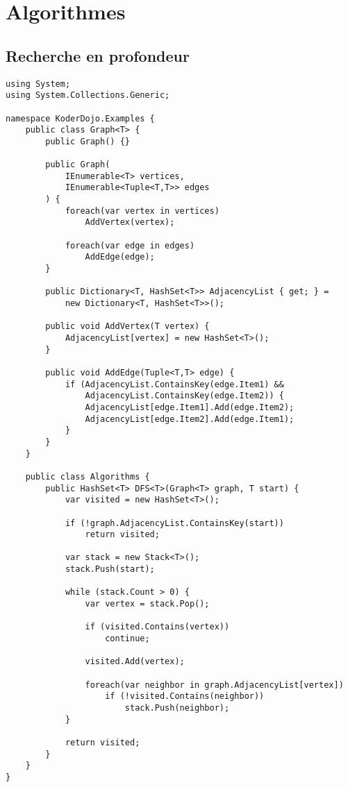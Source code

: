 \newpage
\section{Algorithmes}
\label{algorithms}

\subsection{Recherche en profondeur \cite{Algorithm2}}
\begin{lstlisting}
using System;
using System.Collections.Generic;

namespace KoderDojo.Examples {
    public class Graph<T> {
        public Graph() {}

        public Graph(
            IEnumerable<T> vertices,
            IEnumerable<Tuple<T,T>> edges
        ) {
            foreach(var vertex in vertices)
                AddVertex(vertex);

            foreach(var edge in edges)
                AddEdge(edge);
        }

        public Dictionary<T, HashSet<T>> AdjacencyList { get; } =
            new Dictionary<T, HashSet<T>>();

        public void AddVertex(T vertex) {
            AdjacencyList[vertex] = new HashSet<T>();
        }

        public void AddEdge(Tuple<T,T> edge) {
            if (AdjacencyList.ContainsKey(edge.Item1) &&
                AdjacencyList.ContainsKey(edge.Item2)) {
                AdjacencyList[edge.Item1].Add(edge.Item2);
                AdjacencyList[edge.Item2].Add(edge.Item1);
            }
        }
    }

    public class Algorithms {
        public HashSet<T> DFS<T>(Graph<T> graph, T start) {
            var visited = new HashSet<T>();

            if (!graph.AdjacencyList.ContainsKey(start))
                return visited;
                
            var stack = new Stack<T>();
            stack.Push(start);

            while (stack.Count > 0) {
                var vertex = stack.Pop();

                if (visited.Contains(vertex))
                    continue;

                visited.Add(vertex);

                foreach(var neighbor in graph.AdjacencyList[vertex])
                    if (!visited.Contains(neighbor))
                        stack.Push(neighbor);
            }

            return visited;
        }
    }
}
\end{lstlisting}    

